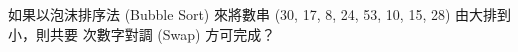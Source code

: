 \ifx\ntpcNinetyThree\undefined[93學年基北區] \fi
\label{ntpc-93-p36} 如果以泡沫排序法 (Bubble Sort) 來將數串 (30, 17, 8, 24, 53, 10, 15, 28) 由大排到小，則共要 \underlineblank{\ref{ntpc-93-p36}} 次數字對調 (Swap) 方可完成？